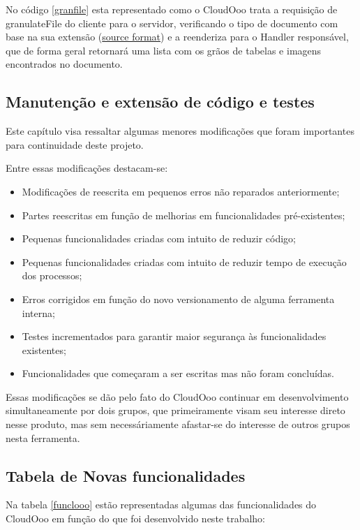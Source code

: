 No código \ref{granfile} esta representado como o CloudOoo trata a requisição de granulateFile do cliente para o servidor, verificando o tipo de documento com base na sua extensão (\underline{source format}) e a reenderiza para o Handler responsável, que de forma geral retornará uma lista com os grãos de tabelas e imagens encontrados no documento.

\subsection{Manutenção e extensão de código e testes}

Este capítulo visa ressaltar algumas menores modificações que foram importantes para continuidade deste projeto.

Entre essas modificações destacam-se:

\begin{itemize}
    \item{Modificações de reescrita em pequenos erros não reparados anteriormente;}
    \item{Partes reescritas em função de melhorias em funcionalidades pré-existentes;}
    \item{Pequenas funcionalidades criadas com intuito de reduzir código;}
    \item{Pequenas funcionalidades criadas com intuito de reduzir tempo de execução dos processos;}
    \item{Erros corrigidos em função do novo versionamento de alguma ferramenta interna;}
    \item{Testes incrementados para garantir maior segurança às funcionalidades existentes;}
    \item{Funcionalidades que começaram a ser escritas mas não foram concluídas.}
\end{itemize}

Essas modificações se dão pelo fato do CloudOoo continuar em desenvolvimento simultaneamente por dois grupos, que primeiramente visam seu interesse direto nesse produto, mas sem necessáriamente afastar-se do interesse de outros grupos nesta ferramenta.

\subsection{Tabela de Novas funcionalidades}

Na tabela \ref{funclooo} estão representadas algumas das funcionalidades do CloudOoo em função do que foi desenvolvido neste trabalho:

